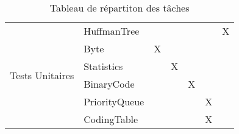 \documentclass[12pt]{article}
\begin{document}
\begin{table}[]
{\begin{tabular}{|l|l|l|l|l|l|l|}
                \multirow{8}{*}{Tests Unitaires}         & HuffmanTree   &            &           &          &            & X          \\ \cline{2-7}
                & Byte          & X          &           &          &            &            \\ \cline{2-7}
                & Statistics    &            & X         &          &            &            \\ \cline{2-7}
                & BinaryCode    &            &           & X        &            &            \\ \cline{2-7}
                & PriorityQueue &            &           &          & X          &            \\ \cline{2-7}
                & CodingTable   &            &           &          & X          &            \\ \hline
            \end{tabular}%
        }
        \caption{Tableau de répartiton des tâches}
        \label{tab:my-table}
    \end{table}
\end{document}

